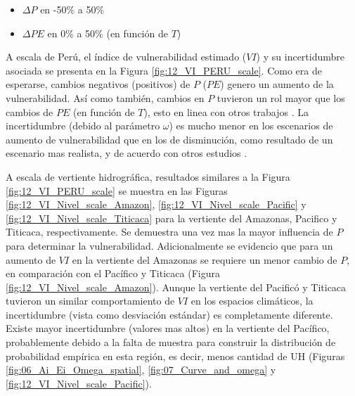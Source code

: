 \documentclass[12pt]{article}
\begin{document}
\begin{itemize}

	\item $\Delta P$ en -50\% a 50\%
	\item $\Delta PE$ en 0\% a 50\% (en función de $T$)

\end{itemize}



A escala de Perú, el índice de vulnerabilidad estimado ($VI$) y su incertidumbre asociada se presenta en la Figura \ref{fig:12_VI_PERU_scale}. Como era de esperarse, cambios negativos (positivos) de $P$ ($PE$) genero un aumento de la vulnerabilidad. Así como también, cambios en $P$ tuvieron un rol mayor que los cambios de $PE$ (en función de $T$), esto en linea con otros trabajos \citep{Singh2015}. La incertidumbre (debido al parámetro $\omega$) es mucho menor en los escenarios de aumento de vulnerabilidad que en los de disminución, como resultado de un escenario mas realista, y de acuerdo con otros estudios \citep{singh2011trading,Singh2015}.

A escala de vertiente hidrográfica, resultados similares a la Figura \ref{fig:12_VI_PERU_scale} se muestra en las Figuras \ref{fig:12_VI_Nivel_scale_Amazon}, \ref{fig:12_VI_Nivel_scale_Pacific} y \ref{fig:12_VI_Nivel_scale_Titicaca} para la vertiente del Amazonas, Pacifico y Titicaca, respectivamente. Se demuestra una vez mas la mayor influencia de $P$ para determinar la vulnerabilidad. Adicionalmente se evidencio que para un aumento de $VI$ en la vertiente del Amazonas se requiere un menor cambio de $P$, en comparación con el Pacífico y Titicaca (Figura \ref{fig:12_VI_Nivel_scale_Amazon}). Aunque la vertiente del Pacificó y Titicaca tuvieron un similar comportamiento de $VI$ en los espacios climáticos, la incertidumbre (vista como desviación estándar) es completamente diferente. Existe mayor incertidumbre (valores mas altos) en la vertiente del Pacífico, probablemente debido a la falta de muestra para construir la distribución de probabilidad empírica en esta región, es decir, menos cantidad de UH (Figuras \ref{fig:06_Ai_Ei_Omega_spatial}, \ref{fig:07_Curve_and_omega} y \ref{fig:12_VI_Nivel_scale_Pacific}). 







\end{document}
